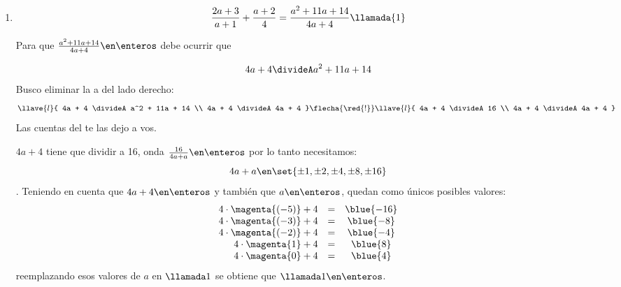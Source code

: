 \begin{enumerate}[label=\enumeracion*)]
  \item
        $$
          \frac{2a + 3}{a+1} + \frac{a+2}{4} = \frac{a^2 + 11a + 14}{4a+4} \llamada{1}
        $$

        Para que $\frac{a^2 + 11a + 14}{4a+4} \en \enteros$ debe ocurrir que

        $$
          4a + 4 \divideA a^2 + 11a + 14
        $$
        Busco eliminar la a del lado derecho:
        $$
          \llave{l}{
            4a + 4 \divideA a^2 + 11a + 14 \\
            4a + 4 \divideA 4a + 4
          }
          \flecha{\red{!}}
          \llave{l}{
            4a + 4 \divideA 16 \\
            4a + 4 \divideA 4a + 4
          }
        $$
        Las cuentas del \red{!} te las dejo a vos.

        $4a+4$ tiene que dividir a 16, onda $\frac{16}{4a + a} \en \enteros$ por lo tanto necesitamos:
        $$
          4a + a \en \set{\pm1,\pm2,\pm4,\pm8,\pm16}
        $$.
        Teniendo en cuenta que $4a + 4 \en \enteros$ y también que $a \en \enteros$, quedan como únicos posibles valores:
        $$
          \begin{array}{rcc}
            4 \cdot \magenta{(-5)} + 4 & = & \blue{-16} \\
            4 \cdot \magenta{(-3)} + 4 & = & \blue{-8}  \\
            4 \cdot \magenta{(-2)} + 4 & = & \blue{-4}  \\
            4 \cdot \magenta{1} + 4    & = & \blue{8}   \\
            4 \cdot \magenta{0} + 4    & = & \blue{4}
          \end{array}
        $$
        reemplazando esos valores de $a$ en $\llamada1$ se obtiene que  $ \llamada1 \en \enteros$.
\end{enumerate}

\begin{aportes}
  \item {}
  \item {}
\end{aportes}
